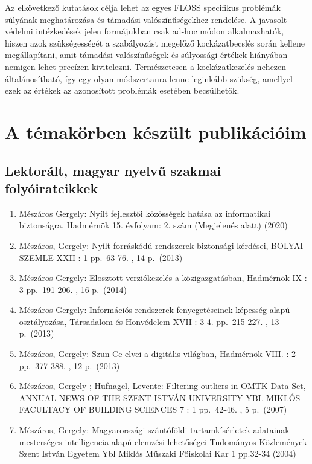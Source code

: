 \documentclass[12pt,magyar,a4paper,oneside]{scrreprt}
\providecommand{\tightlist}{%
  \setlength{\itemsep}{0pt}\setlength{\parskip}{0pt}}
\begin{document}
Az elkövetkező kutatások célja lehet az egyes FLOSS specifikus problémák
súlyának meghatározása és támadási valószínűségekhez rendelése. A
javasolt védelmi intézkedések jelen formájukban csak ad-hoc módon
alkalmazhatók, hiszen azok szükségességét a szabályozást megelőző
kockázatbecslés során kellene megállapítani, amit támadási
valószínűségek és súlyossági értékek hiányában nemigen lehet precízen
kivitelezni. Természetesen a kockázatkezelés nehezen általánosítható,
így egy olyan módszertanra lenne leginkább szükség, amellyel ezek az
értékek az azonosított problémák esetében becsülhetők.

\hypertarget{a-tuxe9makuxf6rben-kuxe9szuxfclt-publikuxe1ciuxf3im}{%
\chapter{A témakörben készült
publikációim}\label{a-tuxe9makuxf6rben-kuxe9szuxfclt-publikuxe1ciuxf3im}}

\hypertarget{lektoruxe1lt-magyar-nyelvux171-szakmai-folyuxf3iratcikkek}{%
\section*{Lektorált, magyar nyelvű szakmai
folyóiratcikkek}\label{lektoruxe1lt-magyar-nyelvux171-szakmai-folyuxf3iratcikkek}}

\begin{enumerate}
\def\labelenumi{\arabic{enumi}.}
\tightlist
\item
  Mészáros Gergely: Nyílt fejlesztői közösségek hatása az informatikai
  biztonságra, Hadmérnök 15. évfolyam: 2. szám (Megjelenés alatt) (2020)
\item
  Mészáros, Gergely: Nyílt forráskódú rendszerek biztonsági kérdései,
  BOLYAI SZEMLE XXII : 1 pp.~63-76. , 14 p.~(2013)
\item
  Mészáros Gergely: Elosztott verziókezelés a közigazgatásban, Hadmérnök
  IX : 3 pp.~191-206. , 16 p.~(2014)
\item
  Mészáros Gergely: Információs rendszerek fenyegetéseinek képesség
  alapú osztályozása, Társadalom és Honvédelem XVII : 3-4. pp.~215-227.
  , 13 p.~(2013)
\item
  Mészáros, Gergely: Szun-Ce elvei a digitális világban, Hadmérnök VIII.
  : 2 pp.~377-388. , 12 p.~(2013)
\item
  Mészáros, Gergely ; Hufnagel, Levente: Filtering outliers in OMTK Data
  Set, ANNUAL NEWS OF THE SZENT ISTVÁN UNIVERSITY YBL MIKLÓS FACULTACY
  OF BUILDING SCIENCES 7 : 1 pp.~42-46. , 5 p.~(2007)
\item
  Mészáros, Gergely: Magyarországi szántóföldi tartamkísérletek
  adatainak mesterséges intelligencia alapú elemzési lehetőségei
  Tudományos Közlemények Szent István Egyetem Ybl Miklós Műszaki
  Főiskolai Kar 1 pp.32-34 (2004)
\end{enumerate}
\end{document}
